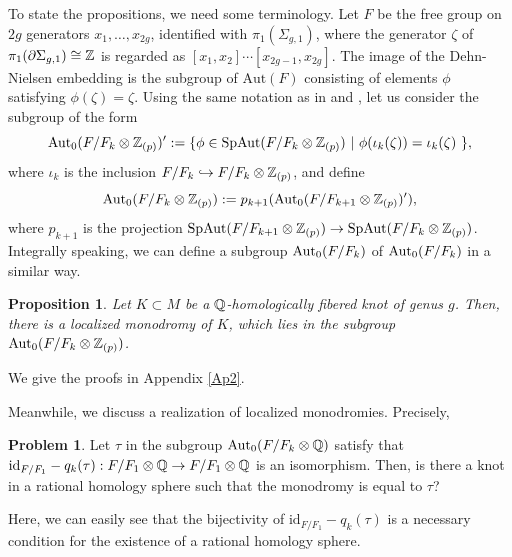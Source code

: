 \documentclass{article}
\theoremstyle{plain}
\newtheorem{prop}[thm]{Proposition}
\theoremstyle{definition}
\newtheorem{prob}[thm]{Problem}
\newcommand{\ra}{\rightarrow}
\newcommand{\Q}{{\Bbb Q}}
\newcommand{\Z}{{\Bbb Z}}
\newcommand{\Aut}{{\rm Aut}}
\newcommand{\SpAut}{{\rm SpAut}}
\begin{document}
{%

To state the propositions, we need some terminology. 
Let $F$ be the free group on $2g$ generators $x_1, \dots, x_{2g}$, identified with $\pi_1(\Sigma_{g,1})$, where the generator $\zeta$ of $\pi_1(\partial \Sigma_{g,1}) \cong \Z$ is regarded as $[x_1,x_2] \cdots [x_{2g-1},x_{2g}]$. 
The image of the Dehn-Nielsen embedding is the subgroup of $\mathrm{Aut}(F)$ consisting of elements $\phi$ satisfying $\phi(\zeta) = \zeta$.
Using the same notation as in \cite{GL} and \cite[Section 3]{Mo2}, let us consider the subgroup of the form
\[ \Aut_0 (F/F_k \otimes \Z_{(p)})' := \{ \phi \in \SpAut (F/F_k \otimes \Z_{(p)} ) \ | \ \phi( \iota_{k} (\zeta)) =\iota_{k} ( \zeta) \ \}, \]
where $\iota_{k} $ is the inclusion $F/F_k \hookrightarrow F/F_k \otimes \Z_{(p)}$, and define
\begin{equation}\label{seq37}
\Aut_0 (F/F_k \otimes \Z_{(p)}):= p_{k+1}(\Aut_0 (F/F_{k+1} \otimes \Z_{(p)})' ),
\end{equation}
where $p_{k+1}$ is the projection $\SpAut (F/F_{k+1} \otimes \Z_{(p)}) \ra \SpAut (F/F_{k} \otimes \Z_{(p)})$. Integrally speaking, we can define a subgroup $ \Aut_0 (F/F_k) $ of
$\Aut_0 (F/F_k)$ in a similar way.
\begin{prop}\label{llk1}
Let $K \subset M$ be a $\Q$-homologically fibered knot of genus $g$. Then, there is a localized monodromy of $K$, which lies in the subgroup $\Aut_0 (F/F_k \otimes \Z_{(p)})$.
\end{prop}
\noindent
We give the proofs in Appendix \ref {Ap2}. %

Meanwhile, we discuss a realization of localized monodromies. Precisely,
\begin{prob}\label{llk14532}
Let $\tau $ in the subgroup $ \Aut_0 (F/F_k \otimes \Q)$ satisfy that
$ \mathrm{id}_{F/F_1}- q_k ( \tau) : F/F_1 \otimes \Q \ra F/F_1 \otimes \Q$ is an isomorphism.
Then,
is there a knot in a rational homology sphere such that the monodromy is equal to $\tau$?
\end{prob}
\noindent
Here, we can easily see that the bijectivity of $\mathrm{id}_{F/F_1}- q_k ( \tau) $ is a necessary condition for the existence of a rational homology sphere.


}
\end{document}

